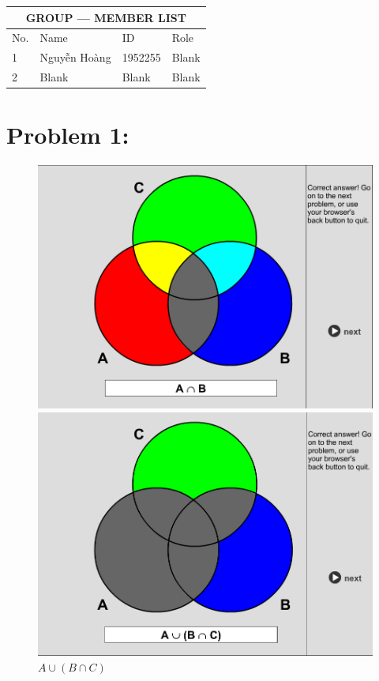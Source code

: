 \documentclass[12pt,en,a4paper]{article}
\begin{document}
	\begin{table}[]
		\centering
		\begin{tabular}{|p{}|p{}|p{}|p{}|}
			\hline
			\multicolumn{4}{|c|}{GROUP --- MEMBER LIST} \\
			\hline
			No. & Name & ID & Role \\
			\hline
			1 & Nguyễn Hoàng & 1952255 & Blank \\
			\hline
			2 & Blank & Blank & Blank \\
			\hline
		\end{tabular}
	\end{table}
	\section*{Problem 1:}
	\begin{figure}[h]
		\begin{minipage}{0.5\textwidth}
			\includegraphics[width=1.0\textwidth]{SOL_set_1_1.png}
			\caption*{$A \cap B$}
			\label{fig:prob_1_1}
		\end{minipage}
		\begin{minipage}{0.5\textwidth}
			\includegraphics[width=1.0\textwidth]{SOL_set_1_2.png}
			\caption*{$A \cup (B \cap C)$}
			\label{fig:prob_1_2}
		\end{minipage}
	\end{figure}
\end{document}
